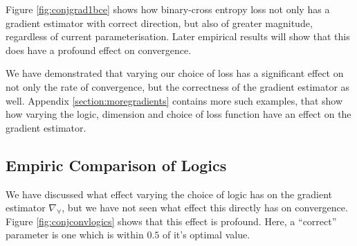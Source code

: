 Figure \ref{fig:conjgrad1bce} shows how binary-cross entropy loss not only has a gradient estimator with correct direction, but also of greater magnitude, regardless of current parameterisation. Later empirical results will show that this does have a profound effect on convergence.

We have demonstrated that varying our choice of loss has a significant effect on not only the rate of convergence, but the correctness of the gradient estimator as well. Appendix \ref{section:moregradients} contains more such examples, that show how varying the logic, dimension and choice of loss function have an effect on the gradient estimator.

\subsection{Empiric Comparison of Logics}

We have discussed what effect varying the choice of logic has on the gradient estimator $\nabla_\forall$, but we have not seen what effect this directly has on convergence. Figure \ref{fig:conjconvlogics} shows that this effect is profound. Here, a ``correct'' parameter is one which is within $0.5$ of it's optimal value.


